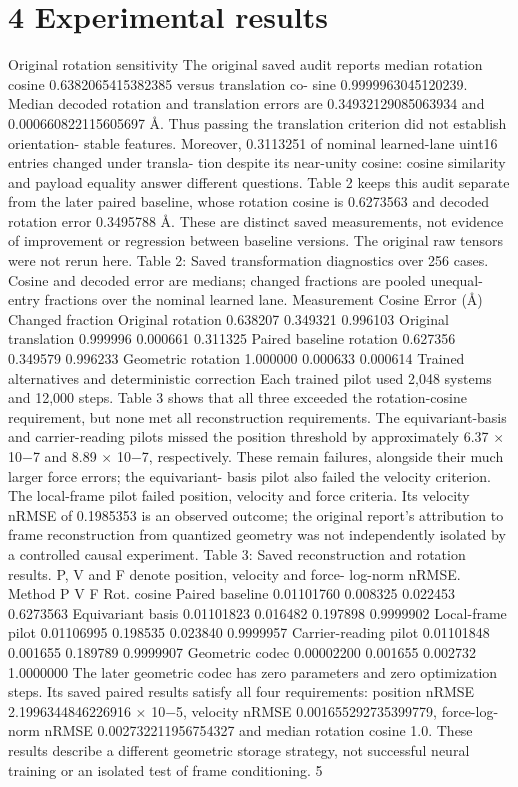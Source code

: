 \documentclass[11pt]{article}
\begin{document}
\section*{4 Experimental results}

Original rotation sensitivity
The original saved audit reports median rotation cosine 0.6382065415382385 versus translation co-
sine 0.9999963045120239. Median decoded rotation and translation errors are 0.34932129085063934
and 0.000660822115605697 Å. Thus passing the translation criterion did not establish orientation-
stable features. Moreover, 0.3113251 of nominal learned-lane uint16 entries changed under transla-
tion despite its near-unity cosine: cosine similarity and payload equality answer different questions.
Table 2 keeps this audit separate from the later paired baseline, whose rotation cosine is 0.6273563
and decoded rotation error 0.3495788 Å. These are distinct saved measurements, not evidence of
improvement or regression between baseline versions. The original raw tensors were not rerun here.
Table 2: Saved transformation diagnostics over 256 cases. Cosine and decoded error are medians;
changed fractions are pooled unequal-entry fractions over the nominal learned lane.
Measurement Cosine Error (Å) Changed fraction
Original rotation 0.638207 0.349321 0.996103
Original translation 0.999996 0.000661 0.311325
Paired baseline rotation 0.627356 0.349579 0.996233
Geometric rotation 1.000000 0.000633 0.000614
Trained alternatives and deterministic correction
Each trained pilot used 2,048 systems and 12,000 steps. Table 3 shows that all three exceeded the
rotation-cosine requirement, but none met all reconstruction requirements. The equivariant-basis
and carrier-reading pilots missed the position threshold by approximately 6.37 \ensuremath{\times} 10\ensuremath{-}7 and 8.89 \ensuremath{\times}
10\ensuremath{-}7, respectively. These remain failures, alongside their much larger force errors; the equivariant-
basis pilot also failed the velocity criterion. The local-frame pilot failed position, velocity and force
criteria. Its velocity nRMSE of 0.1985353 is an observed outcome; the original report’s attribution
to frame reconstruction from quantized geometry was not independently isolated by a controlled
causal experiment.
Table 3: Saved reconstruction and rotation results. P, V and F denote position, velocity and force-
log-norm nRMSE.
Method P V F Rot. cosine
Paired baseline 0.01101760 0.008325 0.022453 0.6273563
Equivariant basis 0.01101823 0.016482 0.197898 0.9999902
Local-frame pilot 0.01106995 0.198535 0.023840 0.9999957
Carrier-reading pilot 0.01101848 0.001655 0.189789 0.9999907
Geometric codec 0.00002200 0.001655 0.002732 1.0000000
The later geometric codec has zero parameters and zero optimization steps. Its saved paired
results satisfy all four requirements: position nRMSE 2.1996344846226916 \ensuremath{\times} 10\ensuremath{-}5, velocity nRMSE
0.001655292735399779, force-log-norm nRMSE 0.002732211956754327 and median rotation cosine
1.0. These results describe a different geometric storage strategy, not successful neural training or
an isolated test of frame conditioning.
5
\end{document}
